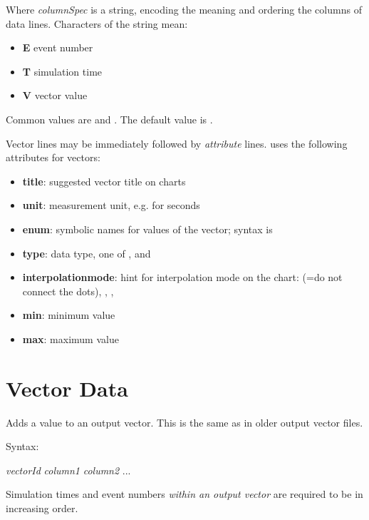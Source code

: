 Where \textit{columnSpec} is a string, encoding the meaning and ordering
the columns of data lines. Characters of the string mean:

\begin{itemize}
  \item \textbf{E} event number
  \item \textbf{T} simulation time
  \item \textbf{V} vector value
\end{itemize}

Common values are  and . The default value is .

Vector lines may be immediately followed by \textit{attribute} lines.
{\opp} uses the following attributes for vectors:

\begin{itemize}
    \item \textbf{title}: suggested vector title on charts
    \item \textbf{unit}: measurement unit, e.g.  for seconds
    \item \textbf{enum}: symbolic names for values of the vector;
          syntax is 
    \item \textbf{type}: data type, one of ,  and 
    \item \textbf{interpolationmode}: hint for interpolation mode on the
          chart:  (=do not connect the dots), ,
          , 
    \item \textbf{min}: minimum value
    \item \textbf{max}: maximum value
\end{itemize}




\section{Vector Data}
\label{sec:result-file-formats:vector-data}

Adds a value to an output vector. This is the same as in older output
vector files.

Syntax:

\hspace{20mm} \textit{vectorId} \textit{column1} \textit{column2} ...

Simulation times and event numbers \textit{within an output vector} are
required to be in increasing order.

